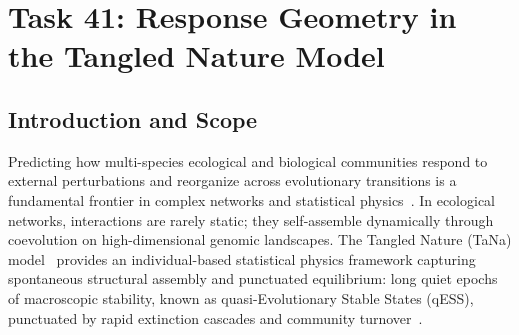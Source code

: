 \chapter{Task 41: Response Geometry in the Tangled Nature Model}
\label{chap:task41}




\begin{abstract}
In the Tangled Nature model of coevolving networks, communities organize into quasi-Evolutionary Stable States (qESS) punctuated by macroscopic reorganizations. Here, we explore the physical mechanisms governing perturbation-response geometry and phase-space dynamics across transitions. At a mutualistic qESS plateau ($N=\Nstar$, $S=\Sstar$), where synergistic mutualism overcomes carrying capacity mortality, global competition imposes an exact survival threshold: four core mutualists concentrate \corebio\% of biomass, while \nhalo\ non-autonomous halo genotypes ($p_{\text{off}} \le 10^{-32}$) persist through mutational leakage from the core (predicted without free parameters, $\rho = \haloRho$). Linearizing the community Jacobian $K$ reveals a spectral timescale inversion: halo linear responses are governed by single-node demographic relaxation ($\lambda = -1.0$) rather than collective core modes ($|\lambda| \in [26, 105]$). Across $5{,}220$ stochastic replicas, an amplitude-matched protocol ($\Delta n_i = -\mathrm{round}\sqrt{n_i}$) eliminates demographic kick artifacts, uncovering a continuous response manifold smoother than demographic noise ($z = \silZMatched$). Finally, tracking an evolutionary transition reveals that stochastic mutational occupancy drives a linear instability ($\mathrm{Re}(\lambda_{\max}) > 0$), triggering deterministic population collapse and latent centroid migration. A fixed-membership control confirms that phase-space delocalization surges by $\sigRatioFix\times$ independent of taxonomic turnover.
\end{abstract}

\section{Introduction and Scope}
\label{sec:t41_intro}
Predicting how multi-species ecological and biological communities respond to external perturbations and reorganize across evolutionary transitions is a fundamental frontier in complex networks and statistical physics~\cite{gao2016universal}. In ecological networks, interactions are rarely static; they self-assemble dynamically through coevolution on high-dimensional genomic landscapes. The Tangled Nature (TaNa) model~\cite{christensen2002tangled} provides an individual-based statistical physics framework capturing spontaneous structural assembly and punctuated equilibrium: long quiet epochs of macroscopic stability, known as quasi-Evolutionary Stable States (qESS), punctuated by rapid extinction cascades and community turnover~\cite{becker2014evolution}.

